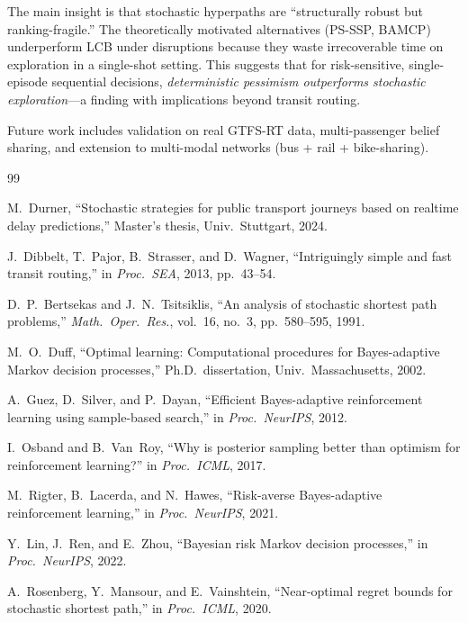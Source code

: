 \documentclass[journal]{IEEEtran}
\begin{document}
The main insight is that stochastic hyperpaths are ``structurally robust but ranking-fragile.'' The theoretically motivated alternatives (PS-SSP, BAMCP) underperform LCB under disruptions because they waste irrecoverable time on exploration in a single-shot setting. This suggests that for risk-sensitive, single-episode sequential decisions, \emph{deterministic pessimism outperforms stochastic exploration}---a finding with implications beyond transit routing.

Future work includes validation on real GTFS-RT data, multi-passenger belief sharing, and extension to multi-modal networks (bus + rail + bike-sharing).


\begin{thebibliography}{99}

M.~Durner, ``Stochastic strategies for public transport journeys based on realtime delay predictions,'' Master's thesis, Univ.\ Stuttgart, 2024.

J.~Dibbelt, T.~Pajor, B.~Strasser, and D.~Wagner, ``Intriguingly simple and fast transit routing,'' in \emph{Proc.\ SEA}, 2013, pp.~43--54.

D.~P.~Bertsekas and J.~N.~Tsitsiklis, ``An analysis of stochastic shortest path problems,'' \emph{Math.\ Oper.\ Res.}, vol.~16, no.~3, pp.~580--595, 1991.

M.~O.~Duff, ``Optimal learning: Computational procedures for Bayes-adaptive Markov decision processes,'' Ph.D.\ dissertation, Univ.\ Massachusetts, 2002.

A.~Guez, D.~Silver, and P.~Dayan, ``Efficient Bayes-adaptive reinforcement learning using sample-based search,'' in \emph{Proc.\ NeurIPS}, 2012.

I.~Osband and B.~Van~Roy, ``Why is posterior sampling better than optimism for reinforcement learning?'' in \emph{Proc.\ ICML}, 2017.

M.~Rigter, B.~Lacerda, and N.~Hawes, ``Risk-averse Bayes-adaptive reinforcement learning,'' in \emph{Proc.\ NeurIPS}, 2021.

Y.~Lin, J.~Ren, and E.~Zhou, ``Bayesian risk Markov decision processes,'' in \emph{Proc.\ NeurIPS}, 2022.

A.~Rosenberg, Y.~Mansour, and E.~Vainshtein, ``Near-optimal regret bounds for stochastic shortest path,'' in \emph{Proc.\ ICML}, 2020.


\end{thebibliography}
\end{document}
